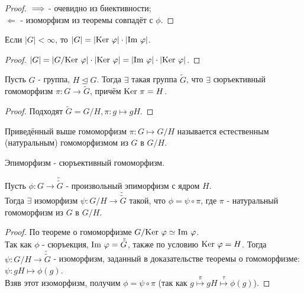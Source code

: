 \begin{proof}  
    $ \\ \Longrightarrow$ - очевидно из биективности;\\
    $\Longleftarrow$ - изоморфизм из теоремы совпадёт с $\phi$.  
\end{proof}
\begin{consequensenum}
    Если $|G| < \infty$, то $|G| = |\textup{Ker }\phi|\cdot|\textup{Im }\phi|$.
\end{consequensenum}
\begin{proof}
    $|G| = |G/\textup{Ker }\phi|\cdot|\textup{Ker }\phi| = |\textup{Im }\phi| \cdot |\textup{Ker }\phi|$.
\end{proof}
\begin{subtheorem}
    Пусть $G$ - группа, $H \unlhd G$. Тогда $\exists$ такая группа $\tilde{G}$, что $\exists$ сюръективный гомоморфизм $\pi: G \rightarrow \tilde{G}$, причём $\textup{Ker }\pi = H$.
\end{subtheorem}
\begin{proof}
    Подходят $\tilde{G} = G/H, \pi: g \mapsto gH$.
\end{proof}
\begin{definition}
    Приведённый выше гомоморфизм $\pi: G \mapsto G/H$ называется естественным (натуральным) гомоморфизмом из $G$ в $G/H$.
\end{definition}
\begin{definition}
    Эпиморфизм - сюръективный гомоморфизм.
\end{definition}
\begin{subtheorem}
    Пусть $\phi: G \rightarrow \tilde{\tilde{G}}$ - произвольный эпиморфизм с ядром $H$.\\
    Тогда $\exists$ изоморфизм $\psi: G/H \rightarrow \tilde{\tilde{G}}$ такой, что $\phi = \psi \circ \pi$, где $\pi$ - натуральный гомоморфизм из $G$ в $G/H$.
\end{subtheorem}
\begin{proof}
    По теореме о гомоморфизме $G/ \textup{Ker }\phi \simeq \textup{Im }\phi$.\\
    Так как $\phi$ - сюръекция, $\textup{Im }\phi =  \tilde{\tilde{G}}$, также по условию $\textup{Ker }\phi = H$. Тогда $\psi: G/H \rightarrow \tilde{\tilde{G}}$ - изоморфизм, заданный в доказательстве теоремы о гомоморфизме: $\psi: gH \mapsto \phi(g)$.\\
    Взяв этот изоморфизм, получим $\phi = \psi \circ \pi$ (так как $g \overset{\pi}{\mapsto} gH \overset{\tau}{\mapsto} \phi(g)$).
\end{proof}
\setcounter{thcount}{0}
\setcounter{concount}{0}
\setcounter{subthcount}{0}
\newpage